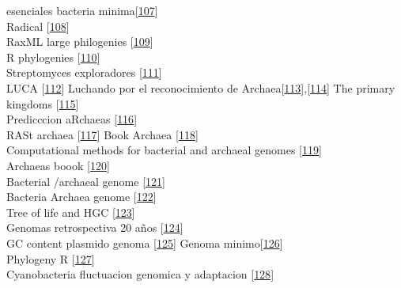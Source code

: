 \documentclass[12pt,twoside]{reedthesis}
\begin{document}
  esenciales bacteria
  minima{[}\protect\hyperlink{ref-glassux5fessentialux5f2006}{107}{]}\\
  Radical
  {[}\protect\hyperlink{ref-narechaniaux5frandomux5f2012}{108}{]}\\
  RaxML large philogenies
  {[}\protect\hyperlink{ref-stamatakisux5fraxmlux5f2014}{109}{]}\\
  R phylogenies
  {[}\protect\hyperlink{ref-phylosequx5fpowerfulux5f2016}{110}{]}\\
  Streptomyces exploradores
  {[}\protect\hyperlink{ref-zachariaux5fexploringux5f2017}{111}{]}\\
  LUCA {[}\protect\hyperlink{ref-woeseux5funiversalux5f1998}{112}{]}
  Luchando por el reconocimiento de
  Archaea{[}\protect\hyperlink{ref-woeseux5fareux5f1981}{113}{]},{[}\protect\hyperlink{ref-woeseux5ftowardsux5f1990}{114}{]}
  The primary kingdoms
  {[}\protect\hyperlink{ref-woeseux5fphylogeneticux5f1977}{115}{]}\\
  Predicccion aRchaeas
  {[}\protect\hyperlink{ref-woeseux5fthereux5f1994}{116}{]}\\
  RASt archaea
  {[}\protect\hyperlink{ref-grahamux5farchaealux5f2000}{117}{]} Book
  Archaea
  {[}\protect\hyperlink{ref-howlandux5fsurprisingux5f2000}{118}{]}\\
  Computational methods for bacterial and archaeal genomes
  {[}\protect\hyperlink{ref-xuux5fcomputationalux5f2008}{119}{]}\\
  Archaeas boook
  {[}\protect\hyperlink{ref-garrettux5farchaeaux5f2008}{120}{]}\\
  Bacterial /archaeal genome
  {[}\protect\hyperlink{ref-kooninux5fcomparisonux5f1997}{121}{]}\\
  Bacteria Archaea genome
  {[}\protect\hyperlink{ref-kooninux5fgenomicsux5f2008}{122}{]}\\
  Tree of life and HGC
  {[}\protect\hyperlink{ref-kooninux5fturbulentux5f2015}{123}{]}\\
  Genomas retrospectiva 20 años
  {[}\protect\hyperlink{ref-landux5finsightsux5f2015}{124}{]}\\
  GC content plasmido genoma
  {[}\protect\hyperlink{ref-nishidaux5fevolutionux5f2012}{125}{]} Genoma
  minimo{[}\protect\hyperlink{ref-coyleux5fmysteriesux5f2016}{126}{]}\\
  Phylogeny R {[}\protect\hyperlink{ref-omearaux5fcranux5f2016}{127}{]}\\
  Cyanobacteria fluctuacion genomica y adaptacion
  {[}\protect\hyperlink{ref-larssonux5fgenomeux5f2011}{128}{]}\\
\end{document}
